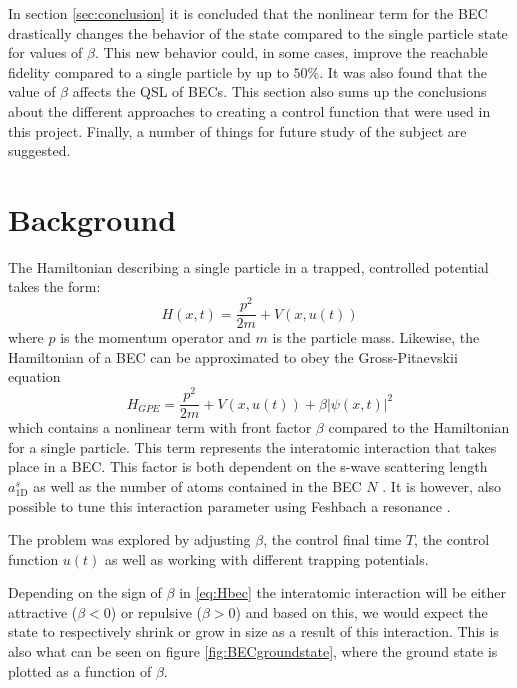 \documentclass[aps,pra,reprint,superscriptaddress]{revtex4-1}
\begin{document}
In section \ref{sec:conclusion} it is concluded that the nonlinear term for the BEC drastically changes the behavior of the state compared to the single particle state for values of $\beta$. This new behavior could, in some cases, improve the reachable fidelity compared to a single particle by up to $50\%$. It was also found that the value of $\beta$ affects the QSL of BECs. This section also sums up the conclusions about the different approaches to creating a control function that were used in this project. Finally, a number of things for future study of the subject are suggested.

\section{\label{sec:back}Background}
The Hamiltonian describing a single particle in a trapped, controlled potential takes the form:
\begin{equation}
	H(x,t) = \frac{p^2}{2m} + V(x,u(t))
\end{equation}
where $p$ is the momentum operator and $m$ is the particle mass. Likewise, the Hamiltonian of a BEC can be approximated to obey the Gross-Pitaevskii equation
\begin{equation}
	H_{GPE} = \frac{p^2}{2m} + V(x,u(t)) + \beta |\psi(x,t)|^2
	\label{eq:Hbec}
\end{equation}
which contains a nonlinear term with front factor $\beta$ compared to the Hamiltonian for a single particle. This term represents the interatomic interaction that takes place in a BEC. This factor is both dependent on the s-wave scattering length $a_{\text{1D}}^s$ as well as the number of atoms contained in the BEC $N$ \cite{Schmiedmayer}. It is however, also possible to tune this interaction parameter using Feshbach a resonance \cite{Feshbach}.


The problem was explored by adjusting $\beta$, the control final time $T$, the control function $u(t)$ as well as working with different trapping potentials.

Depending on the sign of $\beta$ in \eqref{eq:Hbec} the interatomic interaction will be either attractive ($\beta<0$) or repulsive ($\beta>0$) and based on this, we would expect the state to respectively shrink or grow in size as a result of this interaction. This is also what can be seen on figure \ref{fig:BECgroundstate}, where the ground state is plotted as a function of $\beta$.
\end{document}
